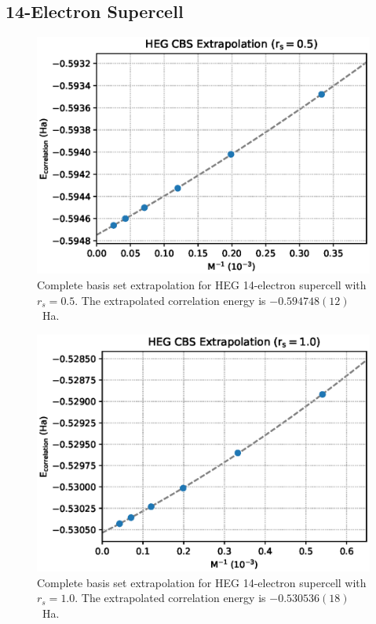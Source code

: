 \documentclass[%
reprint,
 superscriptaddress,
 amsmath,amssymb,
 aps,
]{revtex4-1}
\begin{document}
\subsection{14-Electron Supercell}
\begin{figure}
  \begin{center}
  \includegraphics[width=\linewidth]{figs/cbs14e_05.eps}
  \end{center}
  \vspace{-0.2cm}
  \caption{Complete basis set extrapolation for HEG 14-electron supercell with $r_s=0.5$.
  The extrapolated correlation energy is $-0.594748(12)$~Ha.
  }
  \label{fig:cbs14e_05}
\end{figure}
\begin{figure}
  \begin{center}
  \includegraphics[width=\linewidth]{figs/cbs14e_10.eps}
  \end{center}
  \vspace{-0.2cm}
  \caption{Complete basis set extrapolation for HEG 14-electron supercell with $r_s=1.0$.
  The extrapolated correlation energy is $-0.530536(18)$~Ha.
  }
  \label{fig:cbs14e_10}
\end{figure}
\end{document}
